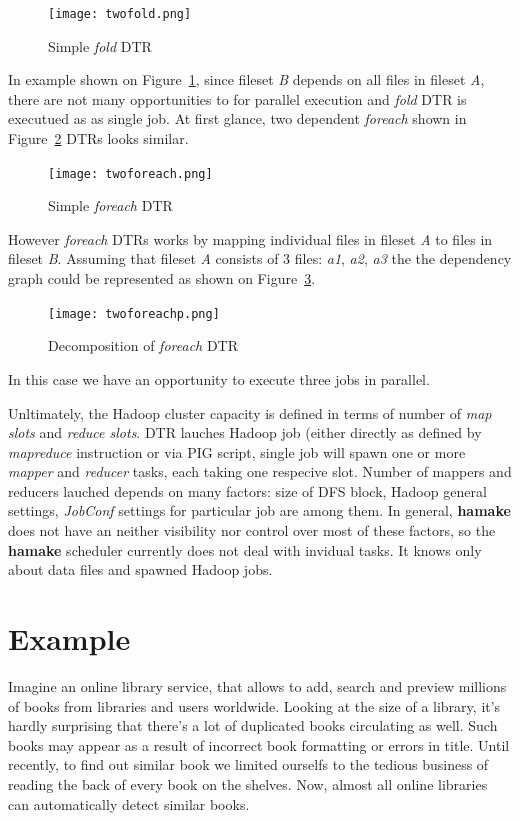 \documentclass{article}
\begin{document}
\begin{figure}[htp]
\centering
\texttt{[image: twofold.png]}
\caption{Simple \emph{fold} DTR}
\label{fig:fold1}
\end{figure}

In example shown on Figure~\ref{fig:fold1}, since fileset \textit{B}
depends on all files in fileset \textit{A}, there are not many
opportunities to for parallel execution and \emph{fold} DTR is
executued as as single job. At first glance, two dependent
\emph{foreach} shown in Figure~\ref{fig:foreach1} DTRs looks similar.

\begin{figure}[htp]
\centering
\texttt{[image: twoforeach.png]}
\caption{Simple \emph{foreach} DTR}
\label{fig:foreach1}
\end{figure}

However \emph{foreach} DTRs works by mapping individual files in
fileset \textit{A} to files in fileset \textit{B}. Assuming that
fileset \textit{A} consists of 3 files: \textit{a1}, \textit{a2},
\textit{a3} the the dependency graph could be represented as shown on
Figure~\ref{fig:foreach2}.

\begin{figure}[htp]
\centering
\texttt{[image: twoforeachp.png]}
\caption{Decomposition of \emph{foreach} DTR}
\label{fig:foreach2}
\end{figure}

In this case we have an opportunity to execute three jobs in parallel.

Unltimately, the Hadoop cluster capacity is defined in terms of number
of \textit{map slots} and \textit{reduce slots}.  DTR lauches Hadoop
job (either directly as defined by \emph{mapreduce} instruction or via
PIG script, single job will spawn one or more \emph{mapper} and
\emph{reducer} tasks, each taking one respecive slot. Number of
mappers and reducers lauched depends on many factors: size of DFS
block, Hadoop general settings, \emph{JobConf} settings for particular
job are among them. In general, \textbf{hamake} does not have an neither
visibility nor control over most of these factors, so the \textbf{hamake}
scheduler currently does not deal with invidual tasks. It knows only
about data files and spawned Hadoop jobs.

\section{Example}

Imagine an online library service, that allows to add, search and preview millions
of books from libraries and users worldwide. Looking at the size of a library, it's hardly 
surprising that there's a lot of duplicated books circulating as well. Such books may appear as a result
of incorrect book formatting or errors in title. Until recently, to find
out similar book we limited ourselfs to the tedious business of reading the back 
of every book on the shelves. Now, almost all online libraries can automatically detect similar books. 
\end{document}
